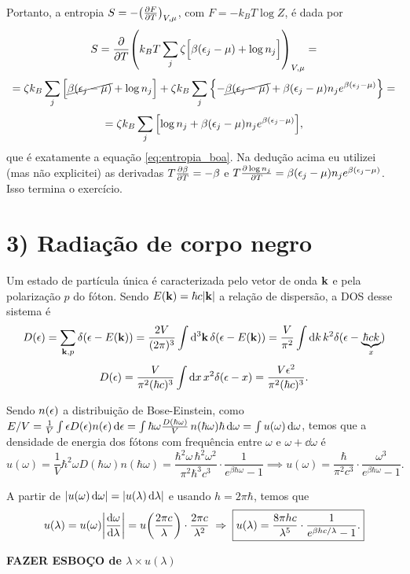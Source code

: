 \documentclass[a4paper,10pt]{article}
\begin{document}
Portanto, a entropia $S = -\qty(\pdv{F}{T})_{V,\mu}$, com $F = -k_B T \log Z$, é dada por
$$
S = \pdv{T} \qty(k_B T \sum_{j} \zeta \Big[\beta(\epsilon_j-\mu) + \log n_j\Big])_{V,\mu} =
$$
$$
= \zeta k_B \sum_{j} \Big[\cancel{\beta(\epsilon_j-\mu)} + \log n_j\Big] +
\zeta k_B \sum_{j} \qty{-\cancel{\beta (\epsilon_j - \mu)} + \beta(\epsilon_j-\mu) n_j e^{\beta(\epsilon_j-\mu)}} =
$$
$$
= \zeta k_B \sum_{j} \qty[\log n_j + \beta (\epsilon_j - \mu) n_j e^{\beta(\epsilon_j-\mu)}],
$$
que é exatamente a equação \ref{eq:entropia_boa}. Na dedução acima eu utilizei (mas não explicitei) as derivadas $T \pdv{\beta}{T} = -\beta$ e $T \pdv{\log n_j}{T} = \beta (\epsilon_j-\mu) n_j e^{\beta(\epsilon_j-\mu)}$. Isso termina o exercício.

\pagebreak

\section*{3) Radiação de corpo negro}

Um estado de partícula única é caracterizada pelo vetor de onda $\vb{k}$ e pela polarização $p$ do fóton. Sendo $E(\vb{k}) = \hbar c \abs{\vb{k}}$ a relação de dispersão, a DOS desse sistema é
$$
D(\epsilon) = \sum_{\vb{k},p} \delta(\epsilon-E(\vb{k})) = \frac{2V}{(2\pi)^3} \int \dd[3]{\vb{k}} \delta(\epsilon-E(\vb{k})) =
\frac{V}{\pi^2} \int \dd{k} k^2 \delta(\epsilon-\underbrace{\hbar c k}_{x})
$$
$$
D(\epsilon) = \frac{V}{\pi^2 (\hbar c)^3} \int \dd{x} x^2 \delta(\epsilon-x)
= \frac{V \epsilon^2}{\pi^2 (\hbar c)^3}.
$$

Sendo $n(\epsilon)$ a distribuição de Bose-Einstein, como $E/V = \frac{1}{V} \int \epsilon D(\epsilon) n(\epsilon) \dd{\epsilon} = \int \hbar \omega \frac{D(\hbar\omega)}{V} \, n(\hbar\omega) \hbar \dd{\omega} = \int u(\omega) \dd{\omega}$, temos que a densidade de energia dos fótons com frequência entre $\omega$ e $\omega + \dd{\omega}$ é
$$
u(\omega) = \frac{1}{V} \hbar^2 \omega D(\hbar\omega) n(\hbar\omega) = \frac{\hbar^2 \omega \, \hbar^2 \omega^2}{\pi^2 \hbar^3 c^3} \cdot
\frac{1}{e^{\beta\hbar\omega} - 1} \implies
\boxed{ u(\omega) =
\frac{\hbar}{\pi^2 c^3} \cdot \frac{\omega^3}{e^{\beta\hbar\omega} - 1}. }
$$

A partir de $\abs{u(\omega) \dd{\omega}} = \abs{u(\lambda) \dd{\lambda}}$ e usando $h = 2\pi \hbar$, temos que
$$
u(\lambda) = u(\omega) \abs{\dv{\omega}{\lambda}} = u\qty(\frac{2\pi c}{\lambda}) \cdot \frac{2\pi c}{\lambda^2} \; \Rightarrow \;
\boxed{ u(\lambda) =
\frac{8 \pi h c}{\lambda^5} \cdot \frac{1}{e^{\beta hc / \lambda} - 1}. }
$$

\textbf{FAZER ESBOÇO de $\lambda \times u(\lambda)$}
\end{document}
